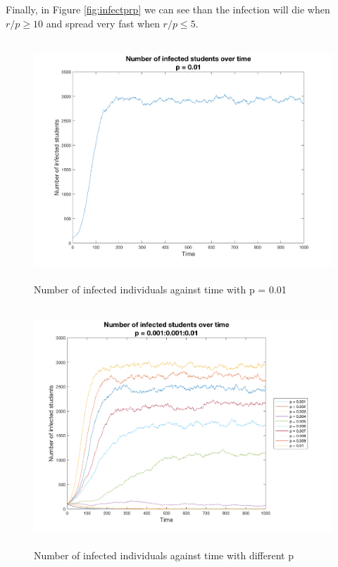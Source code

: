 \documentclass[12pt]{article}
\begin{document}
Finally, in Figure \ref{fig:infectprp} we can see than the infection will die when $r/p \geq 10$ and spread very fast when $r/p \leq 5$.

\begin{figure}[H] %
\centering
\includegraphics[width = 12 cm, height = 9cm]{infectp001.png}
\caption{Number of infected individuals against time with p = 0.01}
\label{fig:infectp001}
\end{figure}

\begin{figure}[H] %
\centering
\includegraphics[width = 12 cm, height = 9cm]{infectp10r.png}
\caption{Number of infected individuals against time with different p}
\label{fig:infectp10r}
\end{figure}
\end{document}
